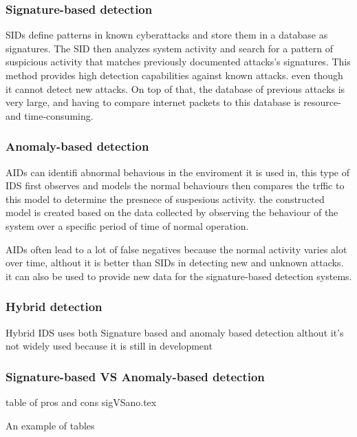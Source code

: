 \subsubsection{Signature-based detection}
SIDs define patterns in known cyberattacks and store them in a database as signatures. The SID then analyzes system activity and search for a pattern of suspicious activity that matches previously documented attacks's signatures. This method provides high detection capabilities against known attacks. even though it cannot detect new attacks. On top of that, the database of previous attacks is very large, and having to compare internet packets to this database is resource- and time-consuming. \cite{NIST-IDS}



\subsubsection{Anomaly-based detection}
AIDs can identifi abnormal behavious in the enviroment it is used in, this type of IDS first observes and models the normal behaviours then compares the trffic to this model to determine the presnece of suspesious activity. the constructed model is created based on the data collected by observing the behaviour of the system over a specific period of time of normal operation. \cite{NIST-IDS}

AIDs often lead to a lot of false negatives because the normal activity varies alot over time, althout it is better than SIDs in detecting new and unknown attacks. it can also be used to provide new data for the signature-based detection systems. \cite{NIST-IDS}




\subsubsection{Hybrid detection}
Hybrid IDS uses both Signature based and anomaly based detection althout it's not widely used because it is still in development
\clearpage

\subsubsection{Signature-based VS Anomaly-based detection}
table of pros and cons
sigVSano.tex
\begin{table}[h]
	\centering
	\caption{An example of tables}
	
	\label{tab:example}
\end{table}




